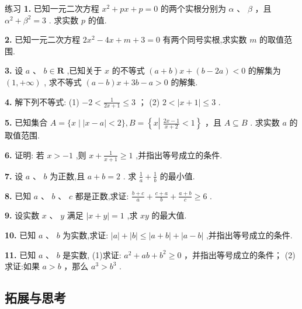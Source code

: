 \documentclass[a4paper,10pt,oneside,fontset=none]{ctexbook}
\renewcommand{\geq}{\geqslant}
\renewcommand{\leq}{\leqslant}
\newenvironment{exercise}[1][]{\begin{exBox}{练习}{#1}}{\end{exBox}}
\numberwithin{equation}{chapter}
\begin{document}
\begin{exercise}
\textbf{1.} 已知一元二次方程 ${x}^{2} + {px} + p = 0$ 的两个实根分别为 $\alpha$ 、 $\beta$ ，且 ${\alpha }^{2} + {\beta }^{2} = 3$ . 求实数 $p$ 的值.
\par\vspace{0.8em}
\textbf{2.} 已知一元二次方程 $2{x}^{2} - {4x} + m + 3 = 0$ 有两个同号实根,求实数 $m$ 的取值范围.
\par\vspace{0.8em}
\textbf{3.} 设 $a\text{ 、 }b \in  \mathbf{R}$ ,已知关于 $x$ 的不等式 $\left( {a + b}\right) x + \left( {b - {2a}}\right)  < 0$ 的解集为 $\left( {1, + \infty }\right)$ , 求不等式 $\left( {a - b}\right) x + {3b} - a > 0$ 的解集.
\par\vspace{0.8em}
\textbf{4.} 解下列不等式: (1) $- 2 < \frac{1}{{2x} + 1} \leq  3$ ； (2) $2 < \left| {x + 1}\right|  \leq  3$ .
\par\vspace{0.8em}
\textbf{5.} 已知集合 $A = \{ x \mid  \left| {x - a}\right|  < 2\} , B = \left\{  {x\left| {\;\frac{{2x} - 1}{x + 2} < 1}\right. }\right\}$ ，且 $A \subseteq  B$ . 求实数 $a$ 的取值范围.
\par\vspace{0.8em}
\textbf{6.} 证明: 若 $x >  - 1$ ,则 $x + \frac{1}{x + 1} \geq  1$ ,并指出等号成立的条件.
\par\vspace{0.8em}
\textbf{7.} 设 $a\text{ 、 }b$ 为正数,且 $a + b = 2$ . 求 $\frac{1}{a} + \frac{1}{b}$ 的最小值.
\par\vspace{0.8em}
\textbf{8.} 已知 $a\text{ 、 }b\text{ 、 }c$ 都是正数,求证: $\frac{b + c}{a} + \frac{c + a}{b} + \frac{a + b}{c} \geq  6$ .
\par\vspace{0.8em}
\textbf{9.} 设实数 $x\text{ 、 }y$ 满足 $\left| {x + y}\right|  = 1$ ,求 ${xy}$ 的最大值.
\par\vspace{0.8em}
\textbf{10.} 已知 $a\text{ 、 }b$ 为实数,求证: $\left| a\right|  + \left| b\right|  \leq  \left| {a + b}\right|  + \left| {a - b}\right|$ ,并指出等号成立的条件.
\par\vspace{0.8em}
\textbf{11.} 已知 $a\text{ 、 }b$ 是实数, (1)求证: ${a}^{2} + {ab} + {b}^{2} \geq  0$ ，并指出等号成立的条件； (2)求证:如果 $a > b$ ，那么 ${a}^{3} > {b}^{3}$ .
\end{exercise}

\subsection*{拓展与思考}
\end{document}
